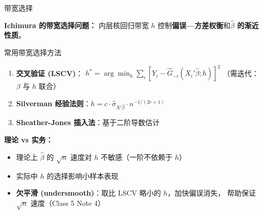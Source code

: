 \documentclass[aspectratio=169, 10pt]{beamer}
\begin{document}
\begin{frame}{带宽选择}

  \textbf{Ichimura 的带宽选择问题：}
  内层核回归带宽 $h$ 控制\textbf{偏误—方差权衡}和\textbf{$\hat\beta$ 的渐近性质}。

  \begin{definitionbox}{{常用带宽选择方法}}
    \begin{enumerate}\setlength{\itemsep}{1pt}
      \item \textbf{交叉验证 (LSCV)}：
      $h^{*} = \arg\min_h \sum_i [Y_i - \hat G_{-i}(X_i'\hat\beta; h)]^2$
      （需迭代：$\beta$ 与 $h$ 联合）
      \item \textbf{Silverman 经验法则}：$h = c \cdot \hat\sigma_{X'\hat\beta} \cdot n^{-1/(2r+1)}$
      \item \textbf{Sheather-Jones 插入法}：基于二阶导数估计
    \end{enumerate}
  \end{definitionbox}

  \begin{keybox}
    \textbf{理论 vs 实务：}
    \begin{itemize}\setlength{\itemsep}{1pt}
      \item 理论上 $\hat\beta$ 的 $\sqrt{n}$ 速度对 $h$ 不敏感（一阶不依赖于 $h$）
      \item 实际中 $h$ 的选择影响小样本表现
      \item \textbf{欠平滑 (undersmooth)}：取比 LSCV 略小的 $h$，加快偏误消失，
      帮助保证 $\sqrt{n}$ 速度（Class 5 Note 4）
    \end{itemize}
  \end{keybox}

\end{frame}
\end{document}
